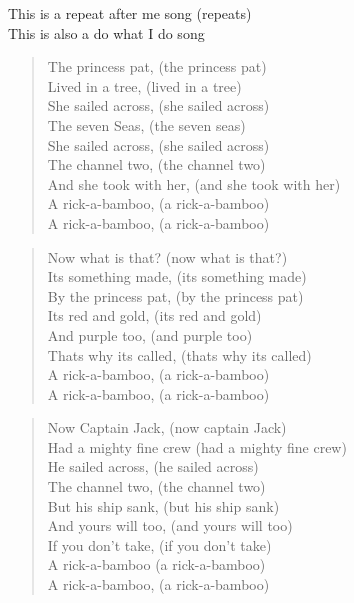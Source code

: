 
This is a repeat after me song (repeats) \\
This is also a do what I do song

\begin{verse}
The princess pat, (the princess pat) \\
Lived in a tree, (lived in a tree) \\
She sailed across, (she sailed across) \\
The seven Seas, (the seven seas) \\
She sailed across, (she sailed across) \\
The channel two, (the channel two) \\
And she took with her, (and she took with her) \\
A rick-a-bamboo, (a rick-a-bamboo) \\
A rick-a-bamboo, (a rick-a-bamboo) \\
\end{verse}

\begin{verse}
Now what is that? (now what is that?) \\
Its something made, (its something made) \\
By the princess pat, (by the princess pat) \\
Its red and gold, (its red and gold) \\
And purple too, (and purple too) \\
Thats why its called, (thats why its called) \\
A rick-a-bamboo, (a rick-a-bamboo) \\
A rick-a-bamboo, (a rick-a-bamboo) \\
\end{verse}

\begin{verse}
Now Captain Jack, (now captain Jack) \\
Had a mighty fine crew (had a mighty fine crew) \\
He sailed across, (he sailed across) \\
The channel two, (the channel two) \\
But his ship sank, (but his ship sank) \\
And yours will too, (and yours will too) \\
If you don't take, (if you don't take) \\
A rick-a-bamboo (a rick-a-bamboo) \\
A rick-a-bamboo, (a rick-a-bamboo) \\
\end{verse}

